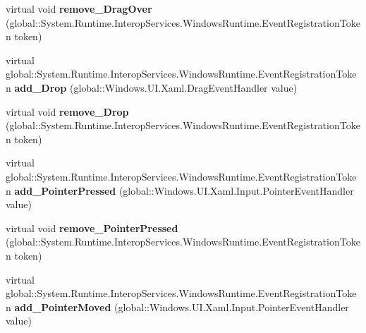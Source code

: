\begin{DoxyCompactItemize}
\item 
\mbox{\label{class_windows_1_1_u_i_1_1_xaml_1_1_u_i_element_a42cb32bddd90c0040c369b5317c8c3c4}} 
virtual void {\bfseries remove\+\_\+\+Drag\+Over} (global\+::\+System.\+Runtime.\+Interop\+Services.\+Windows\+Runtime.\+Event\+Registration\+Token token)
\item 
\mbox{\label{class_windows_1_1_u_i_1_1_xaml_1_1_u_i_element_aaa06508f3ebb80d04bb09db0a46cd1bf}} 
virtual global\+::\+System.\+Runtime.\+Interop\+Services.\+Windows\+Runtime.\+Event\+Registration\+Token {\bfseries add\+\_\+\+Drop} (global\+::\+Windows.\+U\+I.\+Xaml.\+Drag\+Event\+Handler value)
\item 
\mbox{\label{class_windows_1_1_u_i_1_1_xaml_1_1_u_i_element_ac2b3602dc7f654559858450b171f9b01}} 
virtual void {\bfseries remove\+\_\+\+Drop} (global\+::\+System.\+Runtime.\+Interop\+Services.\+Windows\+Runtime.\+Event\+Registration\+Token token)
\item 
\mbox{\label{class_windows_1_1_u_i_1_1_xaml_1_1_u_i_element_a06d0eec496772934d5bfec139854c34c}} 
virtual global\+::\+System.\+Runtime.\+Interop\+Services.\+Windows\+Runtime.\+Event\+Registration\+Token {\bfseries add\+\_\+\+Pointer\+Pressed} (global\+::\+Windows.\+U\+I.\+Xaml.\+Input.\+Pointer\+Event\+Handler value)
\item 
\mbox{\label{class_windows_1_1_u_i_1_1_xaml_1_1_u_i_element_a4e21b0597f1640b1294e0dc5d330e6ca}} 
virtual void {\bfseries remove\+\_\+\+Pointer\+Pressed} (global\+::\+System.\+Runtime.\+Interop\+Services.\+Windows\+Runtime.\+Event\+Registration\+Token token)
\item 
\mbox{\label{class_windows_1_1_u_i_1_1_xaml_1_1_u_i_element_a35fdbc426595a77556b9e7587b4c8f8e}} 
virtual global\+::\+System.\+Runtime.\+Interop\+Services.\+Windows\+Runtime.\+Event\+Registration\+Token {\bfseries add\+\_\+\+Pointer\+Moved} (global\+::\+Windows.\+U\+I.\+Xaml.\+Input.\+Pointer\+Event\+Handler value)
\item 
\mbox{\label{class_windows_1_1_u_i_1_1_xaml_1_1_u_i_element_a63a39b75c65106c0b053b29fc0637f66}} 

\end{DoxyCompactItemize}
